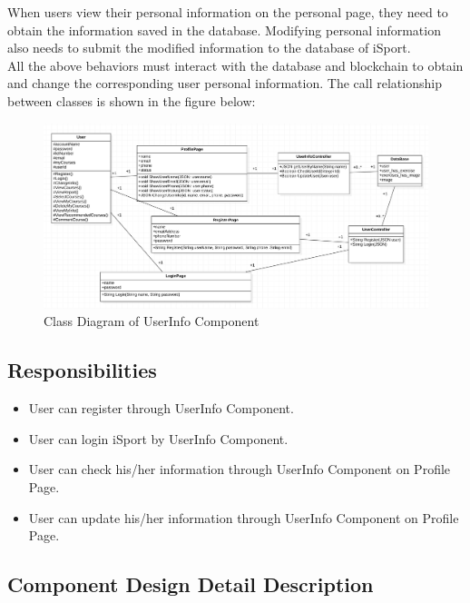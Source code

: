 \documentclass[16pt]{scrreprt}
\begin{document}
\noindent When users view their personal information on the personal page, they need to obtain the information saved in the database. Modifying personal information also needs to submit the modified information to the database of iSport.\\

\noindent All the above behaviors must interact with the database and blockchain to obtain and change the corresponding user personal information. The call relationship between classes is shown in the figure below:
\begin{figure}[H]
	\centering
	\includegraphics[width=1.0\textwidth]{diagrams/userinfo.png}
	\caption{Class Diagram of UserInfo Component}
\end{figure}
\subsection{Responsibilities}
\begin{itemize}
	\item User can register through UserInfo Component.
	\item User can login iSport by UserInfo Component. 
	\item User can check his/her information through UserInfo Component on Profile Page. 
	\item User can update his/her information through UserInfo Component on Profile Page. 
\end{itemize}

\subsection{Component Design Detail Description}
\end{document}
